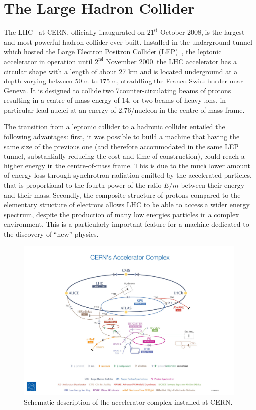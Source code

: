 \section{The Large Hadron Collider}
\label{sec:LHC}

The LHC~\cite{Pettersson:291782,Bruning:782076,Bruning:815187,Benedikt:823808} at CERN, officially inaugurated on $21^\mathrm{st}$ October 2008, is the largest and most powerful hadron collider ever built. Installed in the underground tunnel which hosted the Large Electron Positron Collider (LEP)~\cite{LEPreport1,LEPreport2,Wyss:314187}, the leptonic accelerator in operation until $2^\mathrm{nd}$ November 2000, the LHC accelerator has a circular shape with a length of about 27 km and is located underground at a depth varying between 50\,m to 175\,m, straddling the Franco-Swiss border near Geneva. It is designed to collide two 7\TeV counter-circulating beams of protons resulting in a centre-of-mass energy of 14\TeV, or two beams of heavy ions, in particular lead nuclei at an energy of 2.76\TeV/nucleon in the centre-of-mass frame.

The transition from a leptonic collider to a hadronic collider entailed the following
advantages: first, it was possible to build a machine that having the same size of the previous one (and therefore accommodated in the same LEP tunnel, substantially reducing the cost and time of construction), could reach a higher energy in the centre-of-mass frame. This is due to the much lower amount of energy loss through synchrotron radiation emitted by the accelerated particles, that is proportional to the fourth power of the ratio $E/m$ between their energy and their mass. Secondly, the composite structure of protons compared to the elementary structure of electrons allows LHC to be able to access a wider energy spectrum, despite the production of many low energies particles
in a complex environment. This is a particularly important feature for a machine dedicated to the discovery of ``new'' physics.

\begin{figure}[htb]
\centering
\includegraphics[width=\textwidth]{images/LHC.jpg}
\caption{Schematic description of the accelerator complex installed at CERN.}\label{fig:LHC}
\end{figure}

